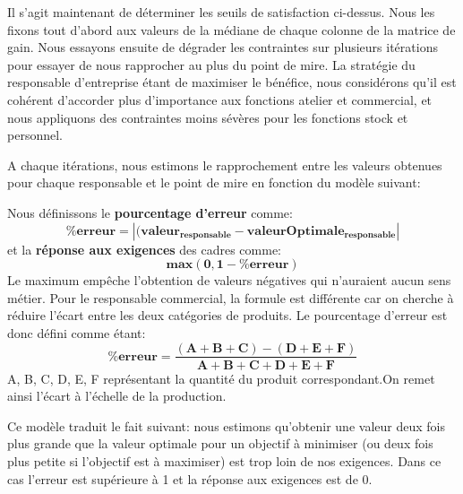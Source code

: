 \documentclass[12pt]{article}
\begin{document}
Il s'agit maintenant de déterminer les seuils de satisfaction ci-dessus. Nous les fixons tout d'abord aux valeurs de la médiane de chaque colonne de la matrice de gain. Nous essayons ensuite de dégrader les contraintes sur plusieurs itérations pour essayer de nous rapprocher au plus du point de mire. La stratégie du responsable d'entreprise étant de maximiser le bénéfice, nous considérons qu'il est cohérent d'accorder plus d'importance aux fonctions atelier et commercial, et nous appliquons des contraintes moins sévères pour les fonctions stock et personnel.

A chaque itérations, nous estimons le rapprochement entre les valeurs obtenues pour chaque responsable et le point de mire en fonction du modèle suivant:
 
Nous définissons le \textbf{pourcentage d'erreur} comme:
	\begin{equation*}
		\boldsymbol{\%erreur=|(valeur_{responsable}-valeur Optimale_{responsable}|}
	\end{equation*}
et la \textbf{réponse aux exigences} des cadres comme:
	\begin{equation*}
		\boldsymbol{max(0, 1-\%erreur)}
	\end{equation*}
Le maximum empêche l’obtention de valeurs négatives qui n’auraient aucun sens métier.
Pour le responsable commercial, la formule est différente car on cherche à réduire l’écart entre les deux catégories de produits. 
Le pourcentage d’erreur est donc défini comme étant:
\begin{equation*}
		\boldsymbol{\%erreur=\frac{(A+B+C)-(D+E+F)}{A+B+C+D+E+F}}
	\end{equation*}
A, B, C, D, E, F représentant la quantité du produit correspondant.On remet ainsi l'écart à l'échelle de la production.

\noindent Ce modèle traduit le fait suivant: nous estimons qu'obtenir une valeur deux fois plus grande que la valeur optimale pour un objectif à minimiser (ou deux fois plus petite si l'objectif est à maximiser) est trop loin de nos exigences. Dans ce cas l'erreur est supérieure à 1 et la réponse aux exigences est de 0.
\end{document}
